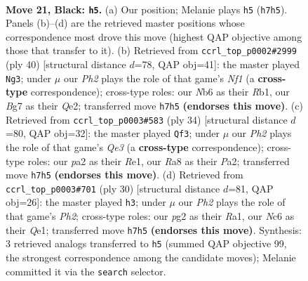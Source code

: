 \documentclass[11pt]{article}
\begin{document}
\clearpage

\begin{figure}[p]\centering
\begin{subfigure}{0.46\textwidth}\centering
\resizebox{\linewidth}{!}{%
\newchessgame
\chessboard[
  setfen={r5k1/pp3pbp/1nn2qp1/3p1b2/3P4/1B4BP/PPN2PP1/RN3QK1 b - - 8 21},
  showmover=false,
  pgfstyle=straightmove, color=movearrow, markmove={h7-h5}
]}
\caption{}
\end{subfigure}\hfill
\begin{subfigure}{0.46\textwidth}\centering
\resizebox{\linewidth}{!}{%
\newchessgame
\chessboard[
  setfen={r2b2k1/1bq2ppp/pp2pn2/8/P1BB1P2/1P2P3/4Q1PP/1R3NK1 w - - 2 21},
  showmover=false,
  pgfstyle=straightmove, color=movearrow, markmove={f1-g3}
]}
\caption{}
\end{subfigure}
\\[4pt]
\begin{subfigure}{0.46\textwidth}\centering
\resizebox{\linewidth}{!}{%
\newchessgame
\chessboard[
  setfen={r2q2k1/pp3pp1/2pn1b1p/3p1b2/3P1B2/1NP1Q3/PP3PPP/4RBK1 w - - 2 18},
  showmover=false,
  pgfstyle=straightmove, color=movearrow, markmove={e3-f3}
]}
\caption{}
\end{subfigure}\hfill
\begin{subfigure}{0.46\textwidth}\centering
\resizebox{\linewidth}{!}{%
\newchessgame
\chessboard[
  setfen={r2q2k1/ppp2ppp/3n1b2/3p1b2/3P1B2/2P2N2/PP3PPP/R3QBK1 w - - 4 16},
  showmover=false,
  pgfstyle=straightmove, color=movearrow, markmove={h2-h3}
]}
\caption{}
\end{subfigure}
\caption{\textbf{Move 21, Black: \texttt{h5}.} (a) Our position; Melanie plays \texttt{h5} (\texttt{h7h5}). Panels (b)--(d) are the retrieved master positions whose correspondence most drove this move (highest QAP objective among those that transfer to it). (b) Retrieved from \texttt{ccrl\_top\_p0002\#2999} (ply 40) [structural distance $d$=78, QAP obj=41]: the master played \texttt{Ng3}; under $\mu$ our \emph{Ph2} plays the role of that game's \emph{Nf1} (a \textbf{cross-type} correspondence); cross-type roles: our \emph{N}b6 as their \emph{R}b1, our \emph{B}g7 as their \emph{Q}e2; transferred move \texttt{h7h5} \textbf{(endorses this move)}. (c) Retrieved from \texttt{ccrl\_top\_p0003\#583} (ply 34) [structural distance $d$=80, QAP obj=32]: the master played \texttt{Qf3}; under $\mu$ our \emph{Ph2} plays the role of that game's \emph{Qe3} (a \textbf{cross-type} correspondence); cross-type roles: our \emph{p}a2 as their \emph{R}e1, our \emph{R}a8 as their \emph{P}a2; transferred move \texttt{h7h5} \textbf{(endorses this move)}. (d) Retrieved from \texttt{ccrl\_top\_p0003\#701} (ply 30) [structural distance $d$=81, QAP obj=26]: the master played \texttt{h3}; under $\mu$ our \emph{Ph2} plays the role of that game's \emph{Ph2}; cross-type roles: our \emph{p}g2 as their \emph{R}a1, our \emph{N}c6 as their \emph{Q}e1; transferred move \texttt{h7h5} \textbf{(endorses this move)}. Synthesis: 3 retrieved analogs transferred to \texttt{h5} (summed QAP objective 99, the strongest correspondence among the candidate moves); Melanie committed it via the \texttt{search} selector.}
\label{fig:thought-m41}
\end{figure}
\end{document}
